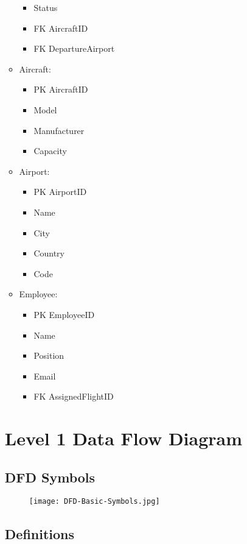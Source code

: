 \documentclass{article}
\begin{document}
\begin{itemize}
\begin{itemize}
\begin{itemize}
    \item       Status
    \item FK    AircraftID
    \item FK    DepartureAirport
    \end{itemize}
\item Aircraft:
    \begin{itemize}
    \item PK    AircraftID
    \item       Model
    \item       Manufacturer
    \item       Capacity
    \end{itemize}
\item Airport:
    \begin{itemize}
    \item PK    AirportID
    \item       Name
    \item       City
    \item       Country
    \item       Code
    \end{itemize}
\item Employee:
    \begin{itemize}
    \item PK    EmployeeID
    \item       Name
    \item       Position
    \item       Email
    \item FK    AssignedFlightID
    \end{itemize}
\end{itemize}

\section{Level 1 Data Flow Diagram}


\subsection{DFD Symbols}
\begin{figure}
    \centering
    \texttt{[image: DFD-Basic-Symbols.jpg]}
    
\end{figure}

\subsection{Definitions}


\end{itemize}
\end{document}
